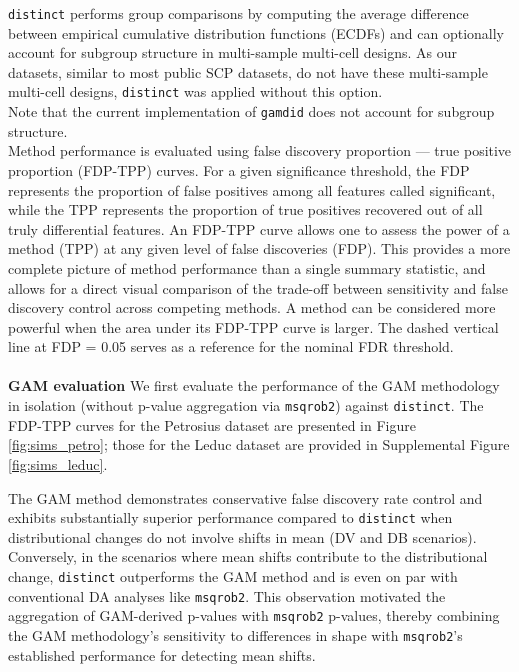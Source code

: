 \texttt{distinct} performs group comparisons by computing the average difference between empirical cumulative distribution functions (ECDFs) and can optionally account for subgroup structure in multi-sample multi-cell designs. As our datasets, similar to most public SCP datasets, do not have these multi-sample multi-cell designs, \texttt{distinct} was applied without this option.\\
Note that the current implementation of \texttt{gamdid} does not account for subgroup structure.\\
Method performance is evaluated using false discovery proportion — true positive proportion (FDP-TPP) curves. For a given significance threshold, the FDP represents the proportion of false positives among all features called significant, while the TPP represents the proportion of true positives recovered out of all truly differential features. An FDP-TPP curve allows one to assess the power of a method (TPP) at any given level of false discoveries (FDP). This provides a more complete picture of method performance than a single summary statistic, and allows for a direct visual comparison of the trade-off between sensitivity and false discovery control across competing methods. A method can be considered more powerful when the area under its FDP-TPP curve is larger. The dashed vertical line at FDP = 0.05 serves as a reference for the nominal FDR threshold.
\\
\\
\textbf{GAM evaluation}
We first evaluate the performance of the GAM methodology in isolation (without p-value aggregation via \texttt{msqrob2}) against \texttt{distinct}. The FDP-TPP curves for the Petrosius dataset are presented in Figure \ref{fig:sims_petro}; those for the Leduc dataset are provided in Supplemental Figure \ref{fig:sims_leduc}.

The GAM method demonstrates conservative false discovery rate control and exhibits substantially superior performance compared to \texttt{distinct} when distributional changes do not involve shifts in mean (DV and DB scenarios). Conversely, in the scenarios where mean shifts contribute to the distributional change, \texttt{distinct} outperforms the GAM method and is even on par with conventional DA analyses like \texttt{msqrob2}. This observation motivated the aggregation of GAM-derived p-values with \texttt{msqrob2} p-values, thereby combining the GAM methodology's sensitivity to differences in shape with \texttt{msqrob2}'s established performance for detecting mean shifts.



